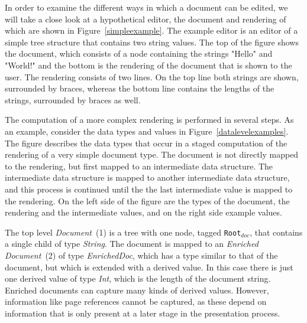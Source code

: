 In order to examine the different ways in which a document can be edited, we will take a close look at a hypothetical editor, the document and rendering of which are shown in Figure~\ref{simpleexample}. The example editor is an editor of a simple tree structure that contains two string values. The top of the figure shows the document, which consists of a node containing the strings "Hello" and "World!" and the bottom is the rendering of the document that is shown to the user. The rendering consists of two lines. On the top line both strings are shown, surrounded by braces, whereas the bottom line contains the lengths of the strings, surrounded by braces as well. 

The computation of a more complex rendering is performed in several steps. As an example, consider the data types and values in Figure~\ref{datalevelexamples}. The figure describes the data types that occur in a staged computation of the rendering of a very simple document type. The document is not directly mapped to the rendering, but first mapped to an intermediate data structure. The intermediate data structure is mapped to another intermediate data structure, and this process is continued until the the last intermediate value is mapped to the rendering. On the left side of the figure are the types of the document, the rendering and the intermediate values, and on the right side example values. 

The top level {\em Document}~(1) is a tree with one node, tagged \texttt{Root}$_{doc}$, that contains a single child of type {\em String}. The document is mapped to an {\em Enriched Document}~(2) of type {\em EnrichedDoc}, which has a type similar to that of the document, but which is extended with a derived value. In this case there is just one derived value of type {\em Int}, which is the length of the document string. Enriched documents can capture many kinds of derived values. However, information like page references cannot be captured, as these depend on information that is only present at a later stage in the presentation process. 


